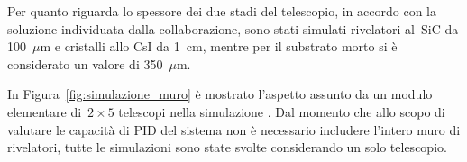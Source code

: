 Per quanto riguarda lo spessore dei due stadi del telescopio, in accordo con la soluzione individuata dalla collaborazione, sono stati simulati rivelatori al~SiC da 100~$\mu$m e cristalli allo CsI da 1~cm, mentre per il substrato morto si è considerato un valore di 350~$\mu$m.







In Figura~\ref{fig:simulazione_muro} è mostrato l'aspetto assunto da un modulo elementare di~$2 \times 5$ telescopi nella simulazione \geant. 
Dal momento che allo scopo di valutare le capacità di PID del sistema non è necessario includere l'intero muro di rivelatori, tutte le simulazioni sono state svolte considerando un solo telescopio.

